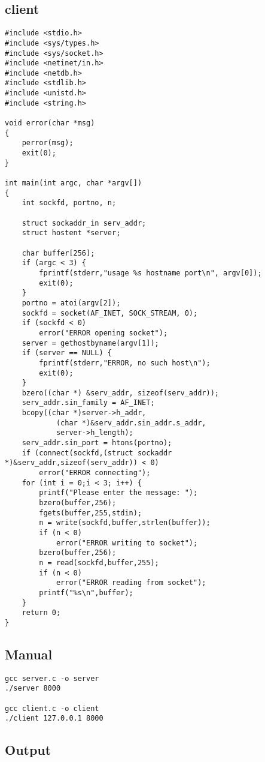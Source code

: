 \documentclass[12pt]{article}
\begin{document}
\subsection{client}

\begin{lstlisting}
#include <stdio.h>
#include <sys/types.h>
#include <sys/socket.h>
#include <netinet/in.h>
#include <netdb.h> 
#include <stdlib.h>
#include <unistd.h>
#include <string.h>

void error(char *msg)
{
	perror(msg);
	exit(0);
}

int main(int argc, char *argv[])
{
	int sockfd, portno, n;

	struct sockaddr_in serv_addr;
	struct hostent *server;

	char buffer[256];
	if (argc < 3) {
		fprintf(stderr,"usage %s hostname port\n", argv[0]);
		exit(0);
	}
	portno = atoi(argv[2]);
	sockfd = socket(AF_INET, SOCK_STREAM, 0);
	if (sockfd < 0) 
		error("ERROR opening socket");
	server = gethostbyname(argv[1]);
	if (server == NULL) {
		fprintf(stderr,"ERROR, no such host\n");
		exit(0);
	}
	bzero((char *) &serv_addr, sizeof(serv_addr));
	serv_addr.sin_family = AF_INET;
	bcopy((char *)server->h_addr, 
			(char *)&serv_addr.sin_addr.s_addr,
			server->h_length);
	serv_addr.sin_port = htons(portno);
	if (connect(sockfd,(struct sockaddr *)&serv_addr,sizeof(serv_addr)) < 0) 
		error("ERROR connecting");
	for (int i = 0;i < 3; i++) {
		printf("Please enter the message: ");
		bzero(buffer,256);
		fgets(buffer,255,stdin);
		n = write(sockfd,buffer,strlen(buffer));
		if (n < 0) 
			error("ERROR writing to socket");
		bzero(buffer,256);
		n = read(sockfd,buffer,255);
		if (n < 0) 
			error("ERROR reading from socket");
		printf("%s\n",buffer);
	}
	return 0;
}
\end{lstlisting}

\subsection{Manual}

\begin{lstlisting}
gcc server.c -o server
./server 8000

gcc client.c -o client
./client 127.0.0.1 8000
\end{lstlisting}

\subsection{Output}
\end{document}
